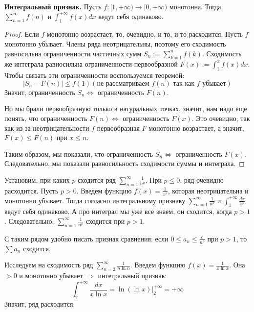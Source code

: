 \textbf{Интегральный признак.}
Пусть $f: [1, +\infty) \to [0, +\infty)$ монотонна. 
Тогда $\sum\limits_{n = 1}^\infty f(n)$ и $\int_1^{+\infty} f(x)dx$ ведут себя одинаково. 
\begin{proof}
    Если $f$ монотонно возрастает, то, очевидно, и то, и то расходится.
    Пусть $f$ монотонно убывает. 
    Члены ряда неотрицательны, поэтому его сходимость равносильна ограниченности частичных сумм $S_n := \sum\limits_{k = 1}^n f(k)$.
    Сходимость же интеграла равносильна ограниченности первообразной $F(x) := \int_1^x f(x)dx$.  
    Чтобы связать эти ограниченности воспользуемся теоремой: \[ \left| S_n - F(n) \right| \leqslant f(1) (\text{не рассматриваем $f(n)$ так как $f$ убывает}) \]
    \quad Значит, ограниченность $S_n \Leftrightarrow$ ограниченность $F(n)$.
    
    \quad Но мы брали первообразную только в натуральных точках, значит, нам надо еще понять, что ограниченность $F(n) \Leftrightarrow$ ограниченность $F(x)$.
    Это очевидно, так как из-за неотрицательности $f$ первообразная $F$ монотонно возрастает, а значит, $F(x) \leqslant F(n)$ при $x \leqslant n$.

    \quad Таким образом, мы показали, что ограниченность $S_n \Leftrightarrow$ ограниченность $F(x)$. 
    Следовательно, мы показали равносильность сходимости суммы и интеграла.
\end{proof}

\vspace{6mm}

\begin{example}
    Установим, при каких $p$ сходится ряд $\sum\limits_{n = 1}^{\infty} \frac{1}{n^p}$.
    При $p \leqslant 0$, ряд очевидно расходится. 
    Пусть $p > 0$.
    Введем функцию $f(x) = \frac{1}{x^p}$, которая неотрицательна и монотонно убывает. 
    Тогда согласно интегральному признаку $\sum\limits_{n = 1}^{\infty} \frac{1}{n^p}$ и $\int_1^{+\infty} \frac{dx}{x^p}$ ведут себя одинаково. 
    А про интеграл мы уже все знаем, он сходится, когда $p > 1$. 
    Следовательно, $\sum\limits_{n = 1}^{\infty} \frac{1}{n^p}$ сходится при $p > 1$.
\end{example}

\begin{follow}
    С таким рядом удобно писать признак сравнения: если $0 \leqslant a_n \leqslant \frac{c}{n^p}$ при $p > 1$, то $\sum a_n$ сходится. 
\end{follow}

\begin{example}
    Исследуем на сходимость ряд $\sum\limits_{n = 2}^\infty \frac{1}{n\ln n}$. 
    Введем функцию $f(x) = \frac{1}{x\ln x}$. Она $> 0$ и монотонно убывает $\Rightarrow$ интегральный признак: \[ \int_2^{+\infty} \frac{dx}{x\ln x} = \ln(\ln x)\big|_2^{+\infty} = +\infty \]
    Значит, ряд расходится. 
\end{example}

